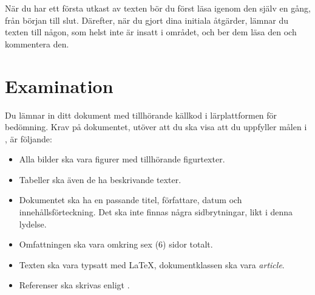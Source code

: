 \documentclass[a4paper]{miunasgn}
\begin{document}
När du har ett första utkast av texten bör du först läsa igenom den själv en 
gång, från början till slut.
Därefter, när du gjort dina initiala åtgärder, lämnar du texten till någon, som 
helst inte är insatt i området, och ber dem läsa den och kommentera den.


\section{Examination}
\label{sec:Examination}
Du lämnar in ditt dokument med tillhörande källkod i lärplattformen för 
bedömning.
Krav på dokumentet, utöver att du ska visa att du uppfyller målen 
i , är följande:
\begin{itemize}
  \item Alla bilder ska vara figurer med tillhörande figurtexter.
  \item Tabeller ska även de ha beskrivande texter.
  \item Dokumentet ska ha en passande titel, författare, datum och 
    innehållsförteckning.
    Det ska inte finnas några sidbrytningar, likt i denna lydelse.
  \item Omfattningen ska vara omkring sex (6) sidor totalt.
  \item Texten ska vara typsatt med LaTeX, dokumentklassen ska vara 
    \emph{article}.
  \item Referenser ska skrivas enligt  
    \cite{IEEEcitation}.
\end{itemize}


\printbibliography
\end{document}
